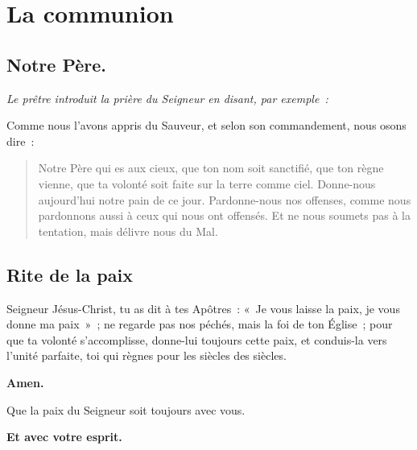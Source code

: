 





\section*{La communion}

\subsection*{Notre Père.}

\emph{Le prêtre introduit la prière du Seigneur en disant, par                  
exemple~: }

Comme nous l'avons appris du Sauveur, et selon son commandement, nous
osons dire~:

\begin{verse}
\noindent
Notre Père qui es aux cieux,\newline
que ton nom soit sanctifié,\newline
que ton règne vienne,\newline
que ta volonté soit faite\newline
sur la terre comme ciel.\newline
Donne-nous aujourd'hui\newline
notre pain de ce jour.\newline
Pardonne-nous nos offenses,\newline
comme nous pardonnons aussi\newline
à ceux qui nous ont offensés.\newline
Et ne nous soumets pas à la tentation,\newline
mais délivre nous du Mal.\newline
\end{verse}

\subsection*{Rite de la paix}

Seigneur Jésus-Christ, tu as dit à tes Apôtres~: «~Je vous laisse la            
paix, je vous donne ma paix~»~; ne regarde pas nos péchés, mais la
foi de ton Église~; pour que ta volonté s'accomplisse, donne-lui
toujours cette paix, et conduis-la vers l'unité parfaite, toi qui
règnes pour les siècles des siècles.

{\bf Amen.}

Que la paix du Seigneur soit toujours avec vous.

{\bf Et avec votre esprit.}

